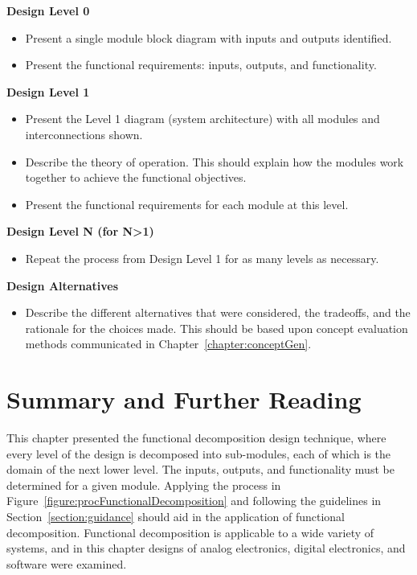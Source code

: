 \textbf{Design Level 0}
\begin{itemize}
\item  Present a single module block diagram with inputs and outputs
  identified.
\item  Present the functional requirements: inputs, outputs, and
  functionality.
\end{itemize}


\textbf{Design Level 1}
\begin{itemize}
\item
  Present the Level 1 diagram (system architecture) with all modules and
  interconnections shown.
\item
  Describe the theory of operation. This should explain how the modules
  work together to achieve the functional objectives.
\item
  Present the functional requirements for each module at this level.
\end{itemize}


\textbf{Design Level N (for N\textgreater1)}
\begin{itemize}
\item
  Repeat the process from Design Level 1 for as many levels as
  necessary.
\end{itemize}

\textbf{Design Alternatives}
\begin{itemize}
\item
  Describe the different alternatives that were considered, the
  tradeoffs, and the rationale for the choices made. This should be
  based upon concept evaluation methods communicated in 
  Chapter~\ref{chapter:conceptGen}.
\end{itemize}

\section{Summary and Further Reading}
\label{section:summary-and-further-reading}

This chapter presented the functional decomposition design technique,
where every level of the design is decomposed into sub-modules, each of
which is the domain of the next lower level. The inputs, outputs, and
functionality must be determined for a given module. Applying the
process in Figure~\ref{figure:procFunctionalDecomposition}
and following the guidelines in Section~\ref{section:guidance} should
aid in the application of functional decomposition. Functional
decomposition is applicable to a wide variety of systems, and in this
chapter designs of analog electronics, digital electronics, and software
were examined.

